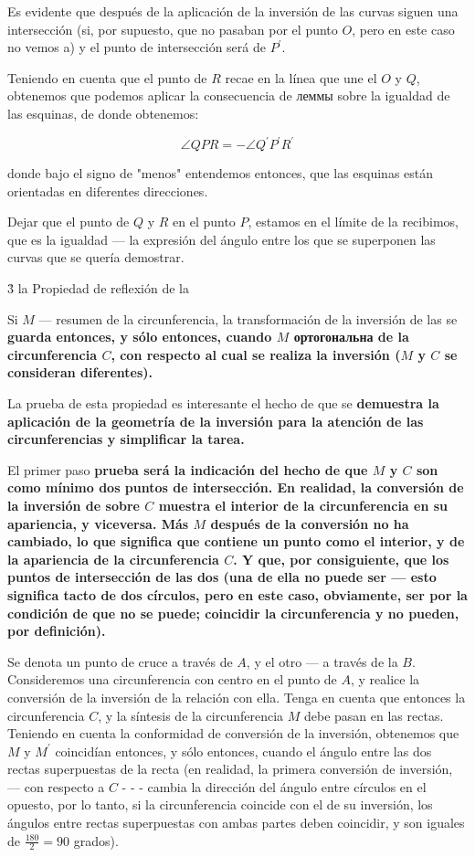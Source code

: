 Es evidente que después de la aplicación de la inversión de las curvas siguen una intersección (si, por supuesto, que no pasaban por el punto $O$, pero en este caso no vemos a) y el punto de intersección será de $P^\prime$.

Teniendo en cuenta que el punto de $R$ recae en la línea que une el $O$ y $Q$, obtenemos que podemos aplicar la consecuencia de леммы sobre la igualdad de las esquinas, de donde obtenemos:

$$ \angle QPR = - \angle Q^\prime P^\prime R^\prime $$

donde bajo el signo de "menos" entendemos entonces, que las esquinas están orientadas en diferentes direcciones.

Dejar que el punto de $Q$ y $R$ en el punto $P$, estamos en el límite de la recibimos, que es la igualdad --- la expresión del ángulo entre los que se superponen las curvas que se quería demostrar.


\h3{ la Propiedad de reflexión de la }

Si $M$ --- resumen de la circunferencia, la transformación de la inversión de las se \bf{guarda} entonces, y sólo entonces, cuando $M$ \bf{ортогональна} de la circunferencia $C$, con respecto al cual se realiza la inversión ($M$ y $C$ se consideran diferentes).

La prueba de esta propiedad es interesante el hecho de que se \bf{demuestra} la aplicación de la geometría de la inversión para la atención de las circunferencias y simplificar la tarea.

El primer paso \bf{prueba} será la indicación del hecho de que $M$ y $C$ son como mínimo dos puntos de intersección. En realidad, la conversión de la inversión de sobre $C$ muestra el interior de la circunferencia en su apariencia, y viceversa. Más $M$ después de la conversión no ha cambiado, lo que significa que contiene un punto como el interior, y de la apariencia de la circunferencia $C$. Y que, por consiguiente, que los puntos de intersección de las dos (una de ella no puede ser --- esto significa tacto de dos círculos, pero en este caso, obviamente, ser por la condición de que no se puede; coincidir la circunferencia y no pueden, por definición).

Se denota un punto de cruce a través de $A$, y el otro --- a través de la $B$. Consideremos una circunferencia con centro en el punto de $A$, y realice la conversión de la inversión de la relación con ella. Tenga en cuenta que entonces la circunferencia $C$, y la síntesis de la circunferencia $M$ debe pasan en las rectas. Teniendo en cuenta la conformidad de conversión de la inversión, obtenemos que $M$ y $M^\prime$ coincidían entonces, y sólo entonces, cuando el ángulo entre las dos rectas superpuestas de la recta (en realidad, la primera conversión de inversión, --- con respecto a $C$ - - - cambia la dirección del ángulo entre círculos en el opuesto, por lo tanto, si la circunferencia coincide con el de su inversión, los ángulos entre rectas superpuestas con ambas partes deben coincidir, y son iguales de $\frac{ 180 }{ 2 } = 90$ grados).


